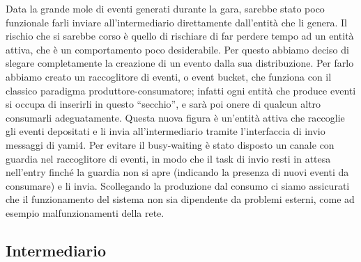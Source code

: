 Data la grande mole di eventi generati durante la gara, sarebbe stato poco funzionale farli inviare all’intermediario direttamente dall’entità che li genera. Il rischio che si sarebbe corso è quello di rischiare di far perdere tempo ad un entità attiva, che è un comportamento poco desiderabile. Per questo abbiamo deciso di slegare completamente la creazione di un evento dalla sua distribuzione. Per farlo abbiamo creato un raccoglitore di eventi, o event bucket, che funziona con il classico paradigma produttore-consumatore; infatti ogni entità che produce eventi si occupa di inserirli in questo “secchio”, e sarà poi onere di qualcun altro consumarli adeguatamente.
Questa nuova figura è un’entità attiva che raccoglie gli eventi depositati e li invia all’intermediario tramite l’interfaccia di invio messaggi di yami4. Per evitare il busy-waiting è stato disposto un canale con guardia nel raccoglitore di eventi, in modo che il task di invio resti in attesa nell’entry finché la guardia non si apre (indicando la presenza di nuovi eventi da consumare) e li invia.
Scollegando la produzione dal consumo ci siamo assicurati che il funzionamento del sistema non sia dipendente da problemi esterni, come ad esempio malfunzionamenti della rete.

\subsection{Intermediario}


